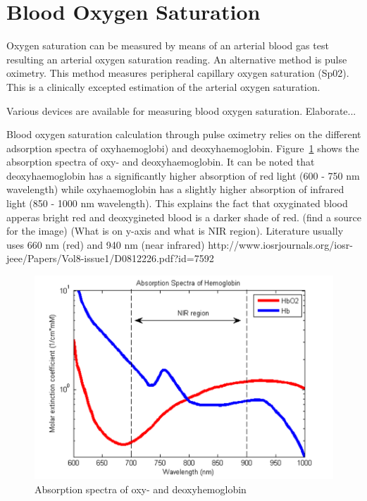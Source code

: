 \section{Blood Oxygen Saturation}
Oxygen saturation can be measured by means of an arterial blood gas test resulting an arterial oxygen saturation reading. An alternative method is pulse oximetry. This method measures peripheral capillary oxygen saturation (Sp02). This is a clinically excepted estimation of the arterial oxygen saturation.

Various devices are available for measuring blood oxygen saturation. Elaborate...

Blood oxygen saturation calculation through pulse oximetry relies on the different adsorption spectra of oxyhaemoglobi) and deoxyhaemoglobin. Figure~\ref{fig:AbsorptionSpectra} shows the absorption spectra of oxy- and deoxyhaemoglobin. It can be noted that deoxyhaemoglobin has a significantly higher absorption of red light (600 - 750 nm wavelength) while oxyhaemoglobin has a slightly higher absorption of infrared light (850 - 1000 nm wavelength). This explains the fact that oxyginated blood apperas bright red and deoxygineted blood is a darker shade of red. (find a source for the image) (What is on y-axis and what is NIR region). Literature usually uses 660 nm (red) and 940 nm (near infrared) http://www.iosrjournals.org/iosr-jeee/Papers/Vol8-issue1/D0812226.pdf?id=7592

\begin{figure}
   \centering
   \includegraphics[scale=0.8]{figs/AbsorptionSpectra}
   \caption{Absorption spectra of oxy- and deoxyhemoglobin}
   \label{fig:AbsorptionSpectra}
\end{figure}

